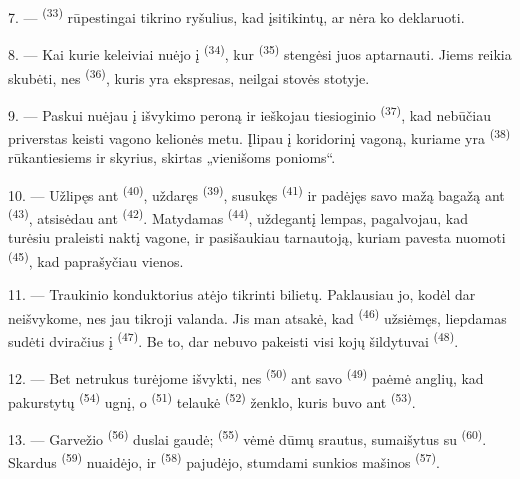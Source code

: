 7. ---  \textsuperscript{(33)} rūpestingai tikrino ryšulius,
kad įsitikintų, ar nėra ko deklaruoti.

8. --- Kai kurie keleiviai nuėjo į  \textsuperscript{(34)}, kur
 \textsuperscript{(35)} stengėsi juos aptarnauti. Jiems reikia
skubėti, nes  \textsuperscript{(36)}, kuris yra ekspresas, neilgai
stovės stotyje.

9. --- Paskui nuėjau į išvykimo peroną ir ieškojau tiesioginio 
\textsuperscript{(37)}, kad nebūčiau priverstas keisti vagono kelionės metu. Įlipau į
koridorinį vagoną, kuriame yra  \textsuperscript{(38)} rūkantiesiems
ir skyrius, skirtas „vienišoms ponioms“.

\VUsaut{3.0mm}

10. --- Užlipęs ant  \textsuperscript{(40)}, uždaręs 
\textsuperscript{(39)}, susukęs  \textsuperscript{(41)} ir padėjęs
savo mažą bagažą ant  \textsuperscript{(43)}, atsisėdau ant
 \textsuperscript{(42)}. Matydamas 
\textsuperscript{(44)}, uždegantį lempas, pagalvojau, kad turėsiu praleisti naktį
vagone, ir pasišaukiau tarnautoją, kuriam pavesta nuomoti 
\textsuperscript{(45)}, kad paprašyčiau vienos.

11. --- Traukinio konduktorius atėjo tikrinti bilietų. Paklausiau jo, kodėl dar
neišvykome, nes jau tikroji valanda. Jis man atsakė, kad  \textsuperscript{(46)} užsiėmęs, liepdamas sudėti dviračius į
 \textsuperscript{(47)}. Be to, dar nebuvo pakeisti visi kojų
šildytuvai \textsuperscript{(48)}.

12. --- Bet netrukus turėjome išvykti, nes  \textsuperscript{(50)}
ant savo  \textsuperscript{(49)} paėmė anglių, kad pakurstytų
 \textsuperscript{(54)} ugnį, o 
\textsuperscript{(51)} telaukė 
\textsuperscript{(52)} ženklo, kuris buvo ant  \textsuperscript{(53)}.

13. --- Garvežio  \textsuperscript{(56)} duslai gaudė;
 \textsuperscript{(55)} vėmė dūmų srautus, sumaišytus su
 \textsuperscript{(60)}. Skardus 
\textsuperscript{(59)} nuaidėjo, ir  \textsuperscript{(58)}
pajudėjo, stumdami sunkios mašinos  \textsuperscript{(57)}.

